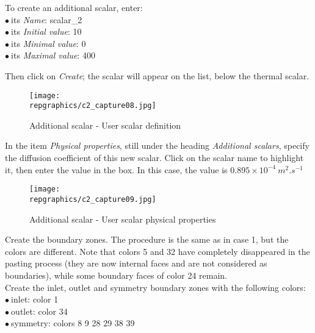 To create an additional scalar, enter:\\
\hspace*{1cm}$\bullet\ $its {\itshape Name}: scalar\_2\\
\hspace*{1cm}$\bullet\ $its {\itshape Initial value}: 10\\
\hspace*{1cm}$\bullet\ $its {\itshape Minimal value}: 0\\
\hspace*{1cm}$\bullet\ $its {\itshape Maximal value}: 400

Then click on {\itshape Create}; the scalar will appear on the list,
below the thermal scalar.

\begin{figure}[h!]
\begin{center}
\texttt{[image: \\repgraphics/c2\_capture08.jpg]}
\caption{Additional scalar - User scalar definition}
\label{fig8_e2}
\end{center}
\end{figure}


\newpage
In the item {\itshape Physical properties}, still under the heading
{\itshape Additional scalars}, specify the diffusion coefficient of this new
scalar. Click on the scalar name to highlight it, then enter the value in the
box. In this case, the value is
$0.895\times 10^{-4}\ m^{2}.s^{-1}$

\begin{figure}[h!]
\begin{center}
\texttt{[image: \\repgraphics/c2\_capture09.jpg]}
\caption{Additional scalar - User scalar physical properties}
\label{fig9_e2}
\end{center}
\end{figure}


\newpage
Create the boundary zones. The procedure is the same as in case 1, but the
colors are different. Note that colors 5 and 32 have completely disappeared in
the pasting process (they are now internal faces and are not considered as
boundaries), while some boundary faces of color 24 remain.\\
Create the inlet, outlet
and symmetry boundary zones with the following colors:\\
\hspace*{1cm}$\bullet\ $inlet: color 1\\
\hspace*{1cm}$\bullet\ $outlet: color 34\\
\hspace*{1cm}$\bullet\ $symmetry: colors 8 9 28 29 38 39\\

